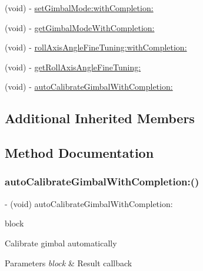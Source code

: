 \begin{DoxyCompactItemize}
\item 
(void) -\/ \hyperlink{interface_p_v_gimabal_ac2bc32c8869d1f5f36c87eb47313fc7e}{set\+Gimbal\+Mode\+:with\+Completion\+:}
\item 
(void) -\/ \hyperlink{interface_p_v_gimabal_a05eb12c923045267506ab6afc2f97275}{get\+Gimbal\+Mode\+With\+Completion\+:}
\item 
(void) -\/ \hyperlink{interface_p_v_gimabal_af41d05f3ab40b6d7cd6bf8c1cd899da8}{roll\+Axis\+Angle\+Fine\+Tuning\+:with\+Completion\+:}
\item 
(void) -\/ \hyperlink{interface_p_v_gimabal_ae4e3e7f2c3e3672a56bd67a8b9212aea}{get\+Roll\+Axis\+Angle\+Fine\+Tuning\+:}
\item 
(void) -\/ \hyperlink{interface_p_v_gimabal_af1ee8faf83afdcbca2f5ff41bc50217b}{auto\+Calibrate\+Gimbal\+With\+Completion\+:}
\end{DoxyCompactItemize}
\subsection*{Additional Inherited Members}


\subsection{Method Documentation}
\mbox{\label{interface_p_v_gimabal_af1ee8faf83afdcbca2f5ff41bc50217b}} 
\subsubsection{\texorpdfstring{auto\+Calibrate\+Gimbal\+With\+Completion\+:()}{autoCalibrateGimbalWithCompletion:()}}
{\footnotesize\ttfamily -\/ (void) auto\+Calibrate\+Gimbal\+With\+Completion\+: \begin{DoxyParamCaption}\item[{(P\+V\+Completion\+Block)}]{block }\end{DoxyParamCaption}}

Calibrate gimbal automatically


\begin{DoxyParams}{Parameters}
{\em block} & Result callback \\
\hline
\end{DoxyParams}
\mbox{\label{interface_p_v_gimabal_af0948378a45db8868439fd3457246dd2}} 
